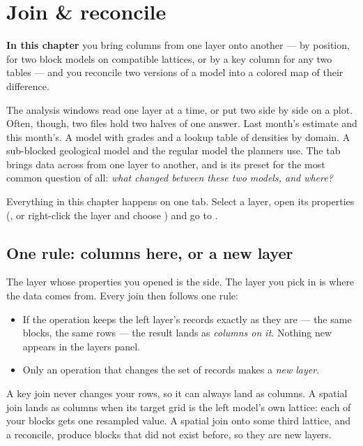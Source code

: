 \chapter{Join \& reconcile}\label{ch:joins}
\begin{goals}
\textbf{In this chapter} you bring columns from one layer onto another — by position, for two block models on compatible lattices, or by a key column for any two tables — and you reconcile two versions of a model into a colored map of their difference.
\end{goals}

The analysis windows read one layer at a time, or put two side by side on a plot. Often, though, two files hold two halves of one answer. Last month's estimate and this month's. A model with grades and a lookup table of densities by domain. A sub-blocked geological model and the regular model the planners use. The  tab brings data across from one layer to another, and  is its preset for the most common question of all: \emph{what changed between these two models, and where?}

Everything in this chapter happens on one tab. Select a layer, open its properties (, or right-click the layer and choose ) and go to .

\section{One rule: columns here, or a new layer}\label{sec:joins-rule}

The layer whose properties you opened is the  side. The layer you pick in  is where the data comes from. Every join then follows one rule:

\begin{itemize}
\item If the operation keeps the left layer's records exactly as they are — the same blocks, the same rows — the result lands as \emph{columns on it}. Nothing new appears in the layers panel.
\item Only an operation that changes the set of records makes a \emph{new layer}.
\end{itemize}

A key join never changes your rows, so it can always land as columns. A spatial join lands as columns when its target grid is the left model's own lattice: each of your blocks gets one resampled value. A spatial join onto some third lattice, and a reconcile, produce blocks that did not exist before, so they are new layers.

